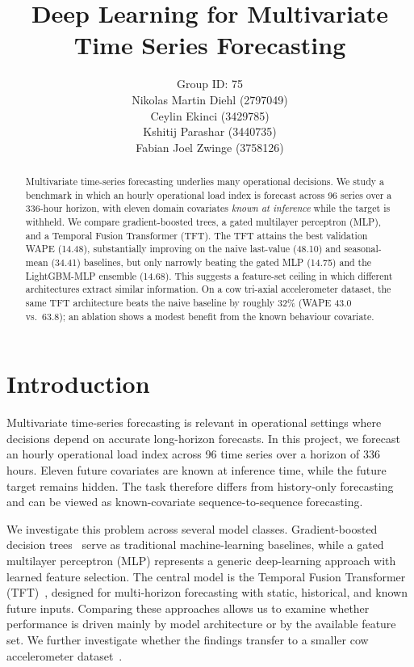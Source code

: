 \documentclass[11pt]{article}
\title{Deep Learning for Multivariate Time Series Forecasting}
\author{
\small
Group ID: 75 \\
\small
Nikolas Martin Diehl (2797049) \\
\small
Ceylin Ekinci (3429785) \\
\small
Kshitij Parashar (3440735) \\
\small
Fabian Joel Zwinge (3758126)
}
\begin{document}
\maketitle
\vspace{-0.6em}


\begin{abstract}
\noindent Multivariate time-series forecasting underlies many operational decisions. We study a benchmark in
which an hourly operational load index is forecast across 96 series over a 336-hour horizon, with
eleven domain covariates \emph{known at inference} while the target is withheld. We compare
gradient-boosted trees, a gated multilayer perceptron (MLP), and a Temporal Fusion Transformer
(TFT). The TFT attains the best validation WAPE (14.48), substantially improving on the naive
last-value (48.10) and seasonal-mean (34.41) baselines, but only narrowly beating the gated
MLP (14.75) and the LightGBM-MLP ensemble (14.68). This suggests a feature-set ceiling in which
different architectures extract similar information. On a cow tri-axial accelerometer dataset,
the same TFT architecture beats the naive baseline by roughly 32\% (WAPE 43.0 vs.\ 63.8);
an ablation shows a modest benefit from the known behaviour covariate.
\end{abstract}



\section{Introduction}
Multivariate time-series forecasting is relevant in operational settings where
decisions depend on accurate long-horizon forecasts. In this project, we forecast
an hourly operational load index across 96 time series over a horizon of 336 hours.
Eleven future covariates are known at inference time, while the future target remains
hidden. The task therefore differs from history-only forecasting and can be viewed
as known-covariate sequence-to-sequence forecasting.
\newline 

\noindent We investigate this problem across several model classes. Gradient-boosted
decision trees~\cite{lightgbm} serve as traditional machine-learning baselines, while
a gated multilayer perceptron (MLP) represents a generic deep-learning approach with
learned feature selection. The central model is the Temporal Fusion Transformer
(TFT)~\cite{tft}, designed for multi-horizon forecasting with static, historical,
and known future inputs. Comparing these approaches allows us to examine whether
performance is driven mainly by model architecture or by the available feature set.
We further investigate whether the findings transfer to a smaller cow accelerometer
dataset~\cite{cowdata}.
\newline
\end{document}

